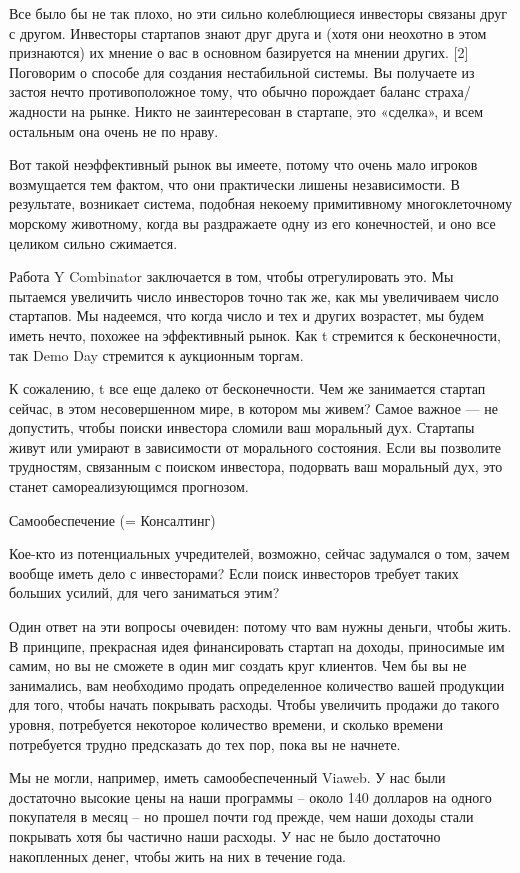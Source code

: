 \documentclass[ebook,12pt,oneside,openany]{memoir}
\begin{document}
Все было бы не так плохо, но эти сильно колеблющиеся инвесторы связаны
друг с другом. Инвесторы стартапов знают друг друга и (хотя они
неохотно в этом признаются) их мнение о вас в основном базируется на
мнении других. [2] Поговорим о способе для создания нестабильной
системы. Вы получаете из застоя нечто противоположное тому, что обычно
порождает баланс страха/жадности на рынке. Никто не заинтересован в
стартапе, это «сделка», и всем остальным она очень не по нраву.

Вот такой неэффективный рынок вы имеете, потому что очень мало игроков
возмущается тем фактом, что они практически лишены независимости. В
результате, возникает система, подобная некоему примитивному
многоклеточному морскому животному, когда вы раздражаете одну из его
конечностей, и оно все целиком сильно сжимается.

Работа Y Combinator заключается в том, чтобы отрегулировать это. Мы
пытаемся увеличить число инвесторов точно так же, как мы увеличиваем
число стартапов. Мы надеемся, что когда число и тех и других
возрастет, мы будем иметь нечто, похожее на эффективный рынок. Как t
стремится к бесконечности, так Demo Day стремится к аукционным торгам.

К сожалению, t все еще далеко от бесконечности. Чем же занимается
стартап сейчас, в этом несовершенном мире, в котором мы живем? Самое
важное — не допустить, чтобы поиски инвестора сломили ваш моральный
дух. Стартапы живут или умирают в зависимости от морального состояния.
Если вы позволите трудностям, связанным с поиском инвестора, подорвать
ваш моральный дух, это станет самореализующимся прогнозом.

Самообеспечение (= Консалтинг)

Кое-кто из потенциальных учредителей, возможно, сейчас задумался о
том, зачем вообще иметь дело с инвесторами? Если поиск инвесторов
требует таких больших усилий, для чего заниматься этим?

Один ответ на эти вопросы очевиден: потому что вам нужны деньги, чтобы
жить. В принципе, прекрасная идея финансировать стартап на доходы,
приносимые им самим, но вы не сможете в один миг создать круг
клиентов. Чем бы вы не занимались, вам необходимо продать определенное
количество вашей продукции для того, чтобы начать покрывать расходы.
Чтобы увеличить продажи до такого уровня, потребуется некоторое
количество времени, и сколько времени потребуется трудно предсказать
до тех пор, пока вы не начнете.

Мы не могли, например, иметь самообеспеченный Viaweb. У нас были
достаточно высокие цены на наши программы – около 140 долларов на
одного покупателя в месяц – но прошел почти год прежде, чем наши
доходы стали покрывать хотя бы частично наши расходы. У нас не было
достаточно накопленных денег, чтобы жить на них в течение года.
\end{document}
